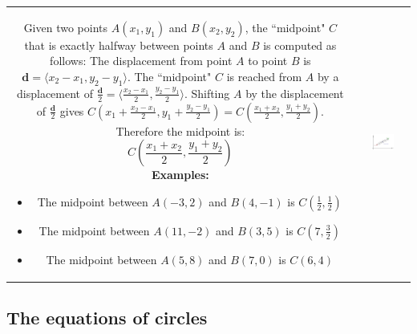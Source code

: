 \documentclass{article}
\begin{document}
\begin{tabular}{cc}
\parbox{0.5\textwidth}{
Given two points \(A(x_1, y_1)\) and \(B(x_2, y_2)\), the ``midpoint" \(C\) that is exactly halfway between points \(A\) and \(B\) is computed as follows: The displacement from point \(A\) to point \(B\) is \(\mathbf{d} = \langle x_2 - x_1, y_2 - y_1 \rangle\). The ``midpoint" \(C\) is reached from \(A\) by a displacement of \(\frac{\mathbf{d}}{2} = \langle \frac{x_2 - x_1}{2}, \frac{y_2 - y_1}{2} \rangle\). Shifting \(A\) by the displacement of \(\frac{\mathbf{d}}{2}\) gives \(C(x_1 + \frac{x_2 - x_1}{2}, y_1 + \frac{y_2 - y_1}{2}) = C(\frac{x_1 + x_2}{2}, \frac{y_1 + y_2}{2})\). Therefore the midpoint is:
\[C(\frac{x_1 + x_2}{2}, \frac{y_1 + y_2}{2})\]
\textbf{Examples:}
\begin{itemize}
\item The midpoint between \(A(-3,2)\) and \(B(4,-1)\) is \(C(\frac{1}{2},\frac{1}{2})\)
\item The midpoint between \(A(11,-2)\) and \(B(3,5)\) is \(C(7,\frac{3}{2})\)
\item The midpoint between \(A(5,8)\) and \(B(7,0)\) is \(C(6,4)\)
\end{itemize}
}
& \parbox{0.5\textwidth}{
\includegraphics[width = 0.5\textwidth]{midpoint_formula}
}
\end{tabular}


\subsection*{The equations of circles}
\end{document}
